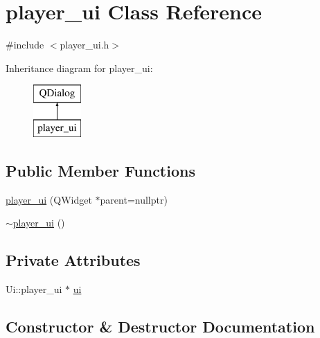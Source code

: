 \hypertarget{classplayer__ui}{}\section{player\+\_\+ui Class Reference}
\label{classplayer__ui}


{\ttfamily \#include $<$player\+\_\+ui.\+h$>$}

Inheritance diagram for player\+\_\+ui\+:\begin{figure}[H]
\begin{center}
\leavevmode
\includegraphics[height=2.000000cm]{classplayer__ui}
\end{center}
\end{figure}
\subsection*{Public Member Functions}
\begin{DoxyCompactItemize}
\item 
\hyperlink{classplayer__ui_a8b77c4bd7bb6ed95375f0a6ad6da72bf}{player\+\_\+ui} (Q\+Widget $\ast$parent=nullptr)
\item 
\hyperlink{classplayer__ui_a6cf1df4505cc647a1f39599e037124cb}{$\sim$player\+\_\+ui} ()
\end{DoxyCompactItemize}
\subsection*{Private Attributes}
\begin{DoxyCompactItemize}
\item 
Ui\+::player\+\_\+ui $\ast$ \hyperlink{classplayer__ui_a69d64263371d122928a055d611e04030}{ui}
\end{DoxyCompactItemize}


\subsection{Constructor \& Destructor Documentation}
\mbox{\label{classplayer__ui_a8b77c4bd7bb6ed95375f0a6ad6da72bf}} 
